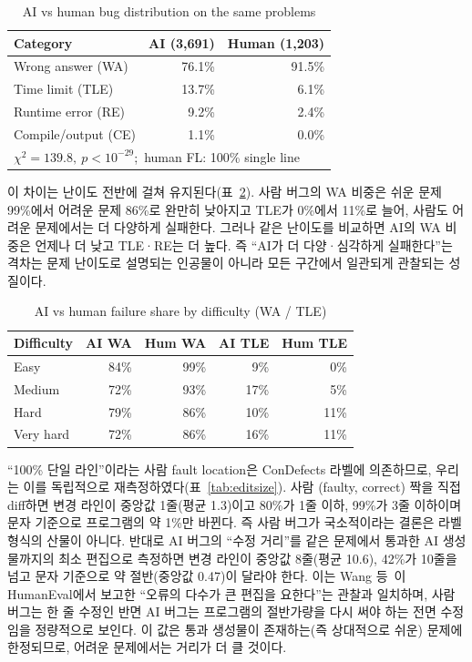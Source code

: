 \documentclass[10pt,conference]{IEEEtran}
\begin{document}
\begin{table}[t]
\caption{AI vs human bug distribution on the same problems}
\label{tab:aihuman}
\centering
\begin{tabular}{lrr}
\toprule
Category & AI (3{,}691) & Human (1{,}203) \\
\midrule
Wrong answer (WA)   & 76.1\% & 91.5\% \\
Time limit (TLE)    & 13.7\% & 6.1\% \\
Runtime error (RE)  & 9.2\%  & 2.4\% \\
Compile/output (CE) & 1.1\%  & 0.0\% \\
\midrule
\multicolumn{3}{l}{$\chi^2=139.8,\ p<10^{-29}$;\ human FL: 100\% single line} \\
\bottomrule
\end{tabular}
\end{table}

이 차이는 난이도 전반에 걸쳐 유지된다(표~\ref{tab:aihumandiff}). 사람 버그의 WA 비중은 쉬운 문제 99\%에서 어려운 문제 86\%로 완만히 낮아지고 TLE가 0\%에서 11\%로 늘어, 사람도 어려운 문제에서는 더 다양하게 실패한다. 그러나 같은 난이도를 비교하면 AI의 WA 비중은 언제나 더 낮고 TLE·RE는 더 높다. 즉 ``AI가 더 다양·심각하게 실패한다''는 격차는 문제 난이도로 설명되는 인공물이 아니라 모든 구간에서 일관되게 관찰되는 성질이다.

\begin{table}[t]
\caption{AI vs human failure share by difficulty (WA / TLE)}
\label{tab:aihumandiff}
\centering
\begin{tabular}{lrrrr}
\toprule
Difficulty & AI WA & Hum WA & AI TLE & Hum TLE \\
\midrule
Easy      & 84\% & 99\% & 9\%  & 0\% \\
Medium    & 72\% & 93\% & 17\% & 5\% \\
Hard      & 79\% & 86\% & 10\% & 11\% \\
Very hard & 72\% & 86\% & 16\% & 11\% \\
\bottomrule
\end{tabular}
\end{table}

``100\% 단일 라인''이라는 사람 fault location은 ConDefects 라벨에 의존하므로, 우리는 이를 독립적으로 재측정하였다(표~\ref{tab:editsize}). 사람 (faulty, correct) 짝을 직접 diff하면 변경 라인이 중앙값 1줄(평균 1.3)이고 80\%가 1줄 이하, 99\%가 3줄 이하이며 문자 기준으로 프로그램의 약 1\%만 바뀐다. 즉 사람 버그가 국소적이라는 결론은 라벨 형식의 산물이 아니다. 반대로 AI 버그의 ``수정 거리''를 같은 문제에서 통과한 AI 생성물까지의 최소 편집으로 측정하면 변경 라인이 중앙값 8줄(평균 10.6), 42\%가 10줄을 넘고 문자 기준으로 약 절반(중앙값 0.47)이 달라야 한다. 이는 Wang 등~\cite{wang2025characteristics}이 HumanEval에서 보고한 ``오류의 다수가 큰 편집을 요한다''는 관찰과 일치하며, 사람 버그는 한 줄 수정인 반면 AI 버그는 프로그램의 절반가량을 다시 써야 하는 전면 수정임을 정량적으로 보인다. 이 값은 통과 생성물이 존재하는(즉 상대적으로 쉬운) 문제에 한정되므로, 어려운 문제에서는 거리가 더 클 것이다.
\end{document}
